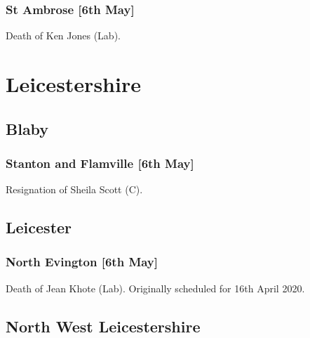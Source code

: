 \documentclass[a4paper,openany]{book}
\begin{document}
\begin{resultsiii}
\subsubsection*{St Ambrose \hspace*{\fill}\nolinebreak[1]%
	\enspace\hspace*{\fill}
	[6th May]}


Death of Ken Jones (Lab).

\section{Leicestershire}

\subsection*{Blaby}

\subsubsection*{Stanton and Flamville \hspace*{\fill}\nolinebreak[1]%
	\enspace\hspace*{\fill}
	[6th May]}


Resignation of Sheila Scott (C).

\subsection*{Leicester}

\subsubsection*{North Evington \hspace*{\fill}\nolinebreak[1]%
	\enspace\hspace*{\fill}
	[6th May]}


Death of Jean Khote (Lab).  Originally scheduled for 16th April 2020.

\subsection*{North West Leicestershire}


\end{resultsiii}
\end{document}
